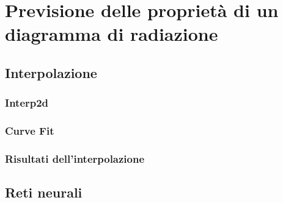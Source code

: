 \documentclass[11pt]{report}
\begin{document}



\chapter{Previsione delle proprietà di un diagramma di radiazione}\label{prev_param}


\section{Interpolazione}\label{interpolazione}


\subsection{Interp2d}\label{interp2d}


\subsection{Curve Fit}\label{curve_fit}
        

\subsection{Risultati dell'interpolazione}\label{risultati_interpolazione}


\section{Reti neurali}\label{reti_neurali}

\end{document}
